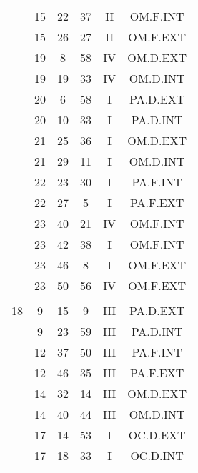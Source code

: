 \documentclass[12pt, a4paper]{article}
\begin{document}
\begin{multicols}{3}
{\begin{tabular}{c c c c c c}
	 	 	 	 & 15 & 22 & 37 & II & OM.F.INT\\%
	 	 	 	 & 15 & 26 & 27 & II & OM.F.EXT\\%
	 	 	 	 & 19 & 8 & 58 & IV & OM.D.EXT\\%
	 	 	 	 & 19 & 19 & 33 & IV & OM.D.INT\\%
	 	 	 	 & 20 & 6 & 58 & I & PA.D.EXT\\%
	 	 	 	 & 20 & 10 & 33 & I & PA.D.INT\\%
	 	 	 	 & 21 & 25 & 36 & I & OM.D.EXT\\%
	 	 	 	 & 21 & 29 & 11 & I & OM.D.INT\\%
	 	 	 	 & 22 & 23 & 30 & I & PA.F.INT\\%
	 	 	 	 & 22 & 27 & 5 & I & PA.F.EXT\\%
	 	 	 	 & 23 & 40 & 21 & IV & OM.F.INT\\%
	 	 	 	 & 23 & 42 & 38 & I & OM.F.INT\\%
	 	 	 	 & 23 & 46 & 8 & I & OM.F.EXT\\%
	 	 	 	 & 23 & 50 & 56 & IV & OM.F.EXT\\%
	 	 	 	 & & & & & \\%
	 	 	 	18 & 9 & 15 & 9 & III & PA.D.EXT\\%
	 	 	 	 & 9 & 23 & 59 & III & PA.D.INT\\%
	 	 	 	 & 12 & 37 & 50 & III & PA.F.INT\\%
	 	 	 	 & 12 & 46 & 35 & III & PA.F.EXT\\%
	 	 	 	 & 14 & 32 & 14 & III & OM.D.EXT\\%
	 	 	 	 & 14 & 40 & 44 & III & OM.D.INT\\%
	 	 	 	 & 17 & 14 & 53 & I & OC.D.EXT\\%
	 	 	 	 & 17 & 18 & 33 & I & OC.D.INT\\%

\end{tabular}}
\end{multicols}
\end{document}
